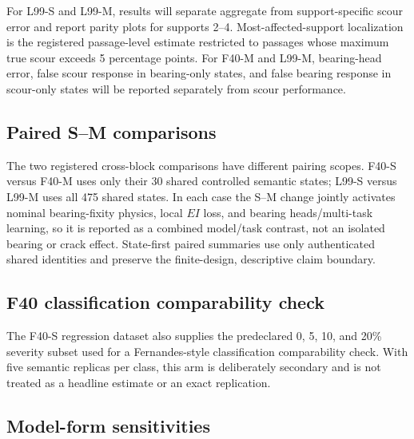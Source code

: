 For L99-S and L99-M, results will separate aggregate from support-specific
scour error and report parity plots for supports 2--4. Most-affected-support
localization is the registered passage-level estimate restricted to passages
whose maximum true scour exceeds 5 percentage points. For F40-M and L99-M,
bearing-head error, false scour response in bearing-only states, and false
bearing response in scour-only states will be reported separately from scour
performance.

\subsection{Paired S--M comparisons}
\label{sec:paired_results}

The two registered cross-block comparisons have different pairing scopes.
F40-S versus F40-M uses only their 30 shared controlled semantic states;
L99-S versus L99-M uses all 475 shared states. In each case the S--M change
jointly activates nominal bearing-fixity physics, local $EI$ loss, and bearing
heads/multi-task learning, so it is reported as a combined model/task contrast,
not an isolated bearing or crack effect. State-first paired summaries use only
authenticated shared identities and preserve the finite-design, descriptive
claim boundary.

\subsection{F40 classification comparability check}
\label{sec:classification_results}

The F40-S regression dataset also supplies the predeclared 0, 5, 10, and 20\%
severity subset used for a Fernandes-style classification comparability check.
With five semantic replicas per class, this arm is deliberately secondary and
is not treated as a headline estimate or an exact replication.

\subsection{Model-form sensitivities}
\label{sec:model_form_results}

